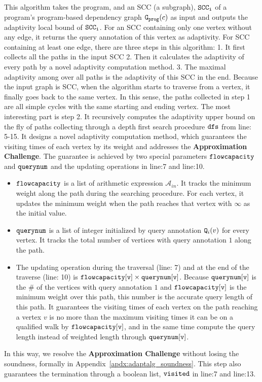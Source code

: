   This algorithm takes the program, and an SCC (a subgraph), 
  $\mathtt{SCC_i}$ of a program's program-based dependency graph $\mathtt{{G_{prog}}}(c)$ as input
and outputs the adaptivity local bound of $\mathtt{SCC_i}$. 
For an SCC containing only one vertex without any edge, it returns the query annotation of this vertex as adaptivity.
For SCC containing at least one edge, 
there are three steps in this algorithm: 1. It first collects all the paths in the input SCC 2. Then it calculates the adaptivity of every path by a novel adaptivity computation method. 3. The maximal adaptivity among over all paths is the adaptivity of this SCC in the end. Because the input graph is SCC, when the algorithm starts to traverse from a vertex, it finally goes back to the same vertex.
In this sense, the paths collected in step 1 are all simple cycles with the same starting and ending vertex. 
The most interesting part is step 2. It recursively computes the adaptivity upper bound on the fly of paths collecting through a depth first search procedure $\mathtt{dfs}$ from line: 5-15.
It designs a novel adaptivity computation method, which guarantees the visiting times of each vertex by its weight and addresses the \textbf{Approximation Challenge}.
The guarantee is achieved by two special parameters $\mathtt{flowcapacity}$ and $\mathtt{querynum}$ and the updating operations in line:7 and line:10.
% 
\begin{itemize}
\item $\mathtt{flowcapacity}$ is a list of arithmetic expression $\mathcal{A}_{in}$.
It tracks the minimum weight
along the path during the 
searching procedure. For each vertex, it updates the minimum weight when the path reaches that vertex with $\infty$ as the initial value.
\item $\mathtt{querynum}$ is a list of integer
initialized by query annotation $\mathtt{Q}_i(v)$ for every vertex. 
It tracks the total number of vertices with query annotation $1$
along the path.
\item
The updating operation
during the traversal 
(line: 7) and 
at the end of the traverse (line: 10) is
$\mathtt{flowcapacity[v] \times querynum[v]}$.
Because $\mathtt{querynum[v]}$ is the \# of the vertices with query annotation $1$ and $\mathtt{flowcapacity[v]}$ is the minimum weight over this path,
this number is the accurate query length of this path. 
It guarantees 
the visiting times of each vertex on the path reaching a vertex $v$ is no more than 
the maximum visiting times it can be on a qualified walk by $\mathtt{flowcapacity[v]}$,
and 
in the same time  compute the query length instead of weighted length through 
$\mathtt{ querynum[v]}$.
\end{itemize}
In this way, we resolve the \textbf{Approximation Challenge} without losing the soundness, formally in Appendix~\ref{apdx:adaptalg_soundness}.
This step also guarantees the termination through a boolean list, $\mathtt{visited}$ in line:7 and line:13.
  

